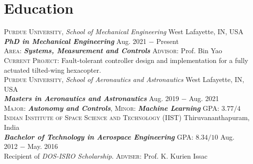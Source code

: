 \documentclass[letterpaper,10pt]{article}
\begin{document}
\section{Education}
\noindent \textsc{Purdue University}, \textit{School of Mechanical Engineering} \hfill West Lafayette, IN, USA \\
\textbf{\textit{PhD in Mechanical Engineering}} \hfill Aug. 2021 $-$ Present\\
\textsc{Area}: \textit{\textbf{Systems, Measurement and Controls}}  \hfill \textsc{Advisor}: Prof. Bin Yao\\
\textsc{Current Project}: Fault-tolerant controller design and implementation for a fully actuated tilted-wing hexacopter.\\

\vspace{5pt}
\noindent \textsc{Purdue University}, \textit{School of Aeronautics and Astronautics} \hfill West Lafayette, IN, USA \\
\textbf{\textit{Masters in Aeronautics and Astronautics}} \hfill Aug. 2019 $-$ Aug. 2021\\
\textsc{Major}: \textit{\textbf{Autonomy and Controls}}, \textsc{Minor}: \textit{\textbf{Machine Learning}}
\hfill \textsc{GPA}: $3.77/4$\\


\vspace{5pt}
\noindent \textsc{Indian Institute of Space Science and Technology (IIST)} \hfill Thiruvananthapuram, India\\
\textbf{\textit{Bachelor of Technology in Aerospace Engineering}} \hfill \textsc{GPA}: $8.34/10$ \hfill Aug. 2012 $-$ May. 2016 \\
Recipient of \textit{DOS-ISRO Scholarship}.
\hfill \textsc{Adviser}: Prof. K. Kurien Issac \\
\end{document}
